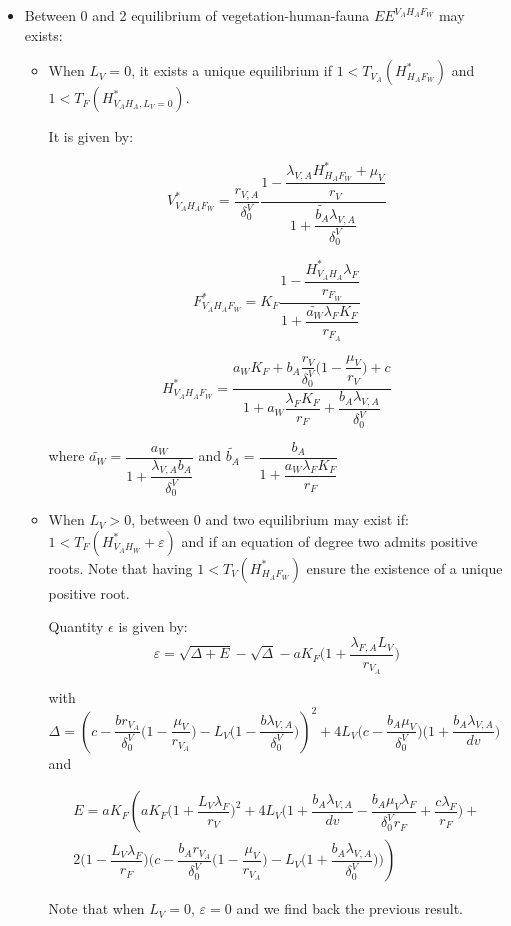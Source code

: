 \documentclass{article}
\newcommand{\lfa}{\lambda_{F, A}}
\newcommand{\lva}{\lambda_{V, A}}
\newcommand{\lfw}{\lambda_{F}}
\newcommand{\dv}{\delta_0^V}
\begin{document}
\begin{itemize}
\begin{itemize}
\end{itemize}

\item Between 0 and 2 equilibrium of vegetation-human-fauna $EE^{V_AH_AF_W}$ may exists:

\begin{itemize}
\item When $L_V = 0$, it exists a unique equilibrium if $1 < T_{V_A}(H^*_{H_AF_W})$ and $1 < T_F(H_{V_AH_A,L_V=0}^*)$.


It is given by:

$$
V^*_{V_AH_AF_W} = \dfrac{r_{V,A}}{\dv} \dfrac{1 - \dfrac{\lva H_{H_AF_W}^* + \mu_V}{r_V}}{1 + \dfrac{\widetilde{b_A} \lva}{\dv}}
$$

$$
F^*_{V_AH_AF_W} = K_F \dfrac{1 - \dfrac{H^*_{V_AH_A} \lfw}{r_{F_W}}}{1 + \dfrac{\widetilde{a_W} \lfw K_F}{r_{F_A}}}
$$

$$
H^*_{V_AH_AF_W} = \dfrac{a_W K_F + b_A \dfrac{r_V}{\dv}\Big(1- \dfrac{\mu_V}{r_V}\Big) + c}{1 + a_W \dfrac{\lfw K_F}{r_F} + \dfrac{b_A \lva}{\dv}}
$$

where $\widetilde{a_W} = \dfrac{a_W}{1 + \dfrac{\lva b_A}{\dv}}$ and $\widetilde{b_A} = \dfrac{b_A}{1 + \dfrac{a_W \lfw K_F}{r_F}}$

\item When $L_V > 0$, between 0 and two equilibrium may exist if: $1 < T_F(H^*_{V_AH_W} + \varepsilon)$ and if an equation of degree two admits positive roots. Note that having $1 < T_V(H^*_{H_AF_W})$ ensure the existence of a unique positive root.

Quantity $\epsilon$ is given by:
$$
\varepsilon = \sqrt{\Delta + E} - \sqrt{\Delta} - aK_F \Big(1 + \dfrac{\lfa L_V}{r_{V_A}} \Big)
$$

with $\Delta = \left(c - \dfrac{b r_{V_A}}{\dv}\Big(1 - \dfrac{\mu_V}{r_{V_A}} \Big) - L_V\Big(1 - \dfrac{b\lva}{\dv} \Big) \right)^2 + 4 L_V \Big(c - \dfrac{b_A \mu_V}{\dv} \Big) \Big(1 + \dfrac{b_A \lva}{dv}\Big)$ and 


\begin{multline*}
E = a K_F \left(aK_F \Big(1 + \dfrac{L_V \lfw}{r_V}\Big)^2 + 4 L_V \Big(1 + \dfrac{b_A \lva}{dv} - \dfrac{b_A \mu_V \lfw}{\dv r_F} + \dfrac{c \lfw}{r_F} \Big) + \right. \\ \left. 2 \Big(1 - \dfrac{L_V\lfw}{r_F}\Big) \Big(c- \dfrac{b_A r_{V_A}}{\dv} \big(1 - \dfrac{\mu_V}{r_{V_A}} \big) - L_V \big(1 + \dfrac{b_A \lva}{\dv}\big) \Big) \right)
\end{multline*}

Note that when $L_V = 0$, $\varepsilon = 0$ and we find back the previous result.


\end{itemize}
\end{itemize}
\end{document}
